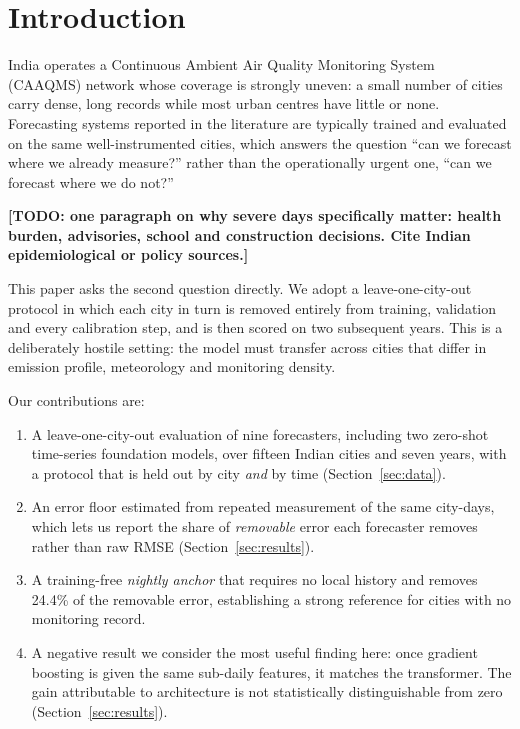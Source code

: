 \documentclass[conference]{IEEEtran}
\newcommand{\todo}[1]{\textbf{[TODO: #1]}}
\begin{document}
\section{Introduction}

India operates a Continuous Ambient Air Quality Monitoring System (CAAQMS) network
whose coverage is strongly uneven: a small number of cities carry dense, long records
while most urban centres have little or none. Forecasting systems reported in the
literature are typically trained and evaluated on the same well-instrumented cities,
which answers the question ``can we forecast where we already measure?'' rather than
the operationally urgent one, ``can we forecast where we do not?''

\todo{one paragraph on why severe days specifically matter: health burden, advisories,
school and construction decisions. Cite Indian epidemiological or policy sources.}

This paper asks the second question directly. We adopt a leave-one-city-out protocol in
which each city in turn is removed entirely from training, validation and every
calibration step, and is then scored on two subsequent years. This is a deliberately
hostile setting: the model must transfer across cities that differ in emission profile,
meteorology and monitoring density.

Our contributions are:

\begin{enumerate}
\item A leave-one-city-out evaluation of nine forecasters, including two zero-shot
time-series foundation models, over fifteen Indian cities and seven years, with a
protocol that is held out by city \emph{and} by time (Section~\ref{sec:data}).
\item An error floor estimated from repeated measurement of the same city-days, which
lets us report the share of \emph{removable} error each forecaster removes rather than
raw RMSE (Section~\ref{sec:results}).
\item A training-free \emph{nightly anchor} that requires no local history and removes
24.4\% of the removable error, establishing a strong reference for cities with no
monitoring record.
\item A negative result we consider the most useful finding here: once gradient
boosting is given the same sub-daily features, it matches the transformer. The gain
attributable to architecture is not statistically distinguishable from zero
(Section~\ref{sec:results}).
\end{enumerate}
\end{document}
